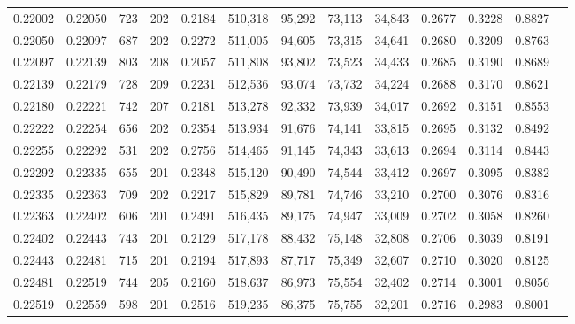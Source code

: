 \begin{tabular}{rrrrrrrrrrrrr}
0.22002 & 0.22050 &   723 & 202 &                                     0.2184 & 510,318 &  95,292 &  73,113 &  34,843 & 0.2677 & 0.3228 & 0.8827 \\
0.22050 & 0.22097 &   687 & 202 &                                     0.2272 & 511,005 &  94,605 &  73,315 &  34,641 & 0.2680 & 0.3209 & 0.8763 \\
0.22097 & 0.22139 &   803 & 208 &                                     0.2057 & 511,808 &  93,802 &  73,523 &  34,433 & 0.2685 & 0.3190 & 0.8689 \\
0.22139 & 0.22179 &   728 & 209 &                                     0.2231 & 512,536 &  93,074 &  73,732 &  34,224 & 0.2688 & 0.3170 & 0.8621 \\
0.22180 & 0.22221 &   742 & 207 &                                     0.2181 & 513,278 &  92,332 &  73,939 &  34,017 & 0.2692 & 0.3151 & 0.8553 \\
0.22222 & 0.22254 &   656 & 202 &                                     0.2354 & 513,934 &  91,676 &  74,141 &  33,815 & 0.2695 & 0.3132 & 0.8492 \\
0.22255 & 0.22292 &   531 & 202 &                                     0.2756 & 514,465 &  91,145 &  74,343 &  33,613 & 0.2694 & 0.3114 & 0.8443 \\
0.22292 & 0.22335 &   655 & 201 &                                     0.2348 & 515,120 &  90,490 &  74,544 &  33,412 & 0.2697 & 0.3095 & 0.8382 \\
0.22335 & 0.22363 &   709 & 202 &                                     0.2217 & 515,829 &  89,781 &  74,746 &  33,210 & 0.2700 & 0.3076 & 0.8316 \\
0.22363 & 0.22402 &   606 & 201 &                                     0.2491 & 516,435 &  89,175 &  74,947 &  33,009 & 0.2702 & 0.3058 & 0.8260 \\
0.22402 & 0.22443 &   743 & 201 &                                     0.2129 & 517,178 &  88,432 &  75,148 &  32,808 & 0.2706 & 0.3039 & 0.8191 \\
0.22443 & 0.22481 &   715 & 201 &                                     0.2194 & 517,893 &  87,717 &  75,349 &  32,607 & 0.2710 & 0.3020 & 0.8125 \\
0.22481 & 0.22519 &   744 & 205 &                                     0.2160 & 518,637 &  86,973 &  75,554 &  32,402 & 0.2714 & 0.3001 & 0.8056 \\
0.22519 & 0.22559 &   598 & 201 &                                     0.2516 & 519,235 &  86,375 &  75,755 &  32,201 & 0.2716 & 0.2983 & 0.8001 \\

\end{tabular}
